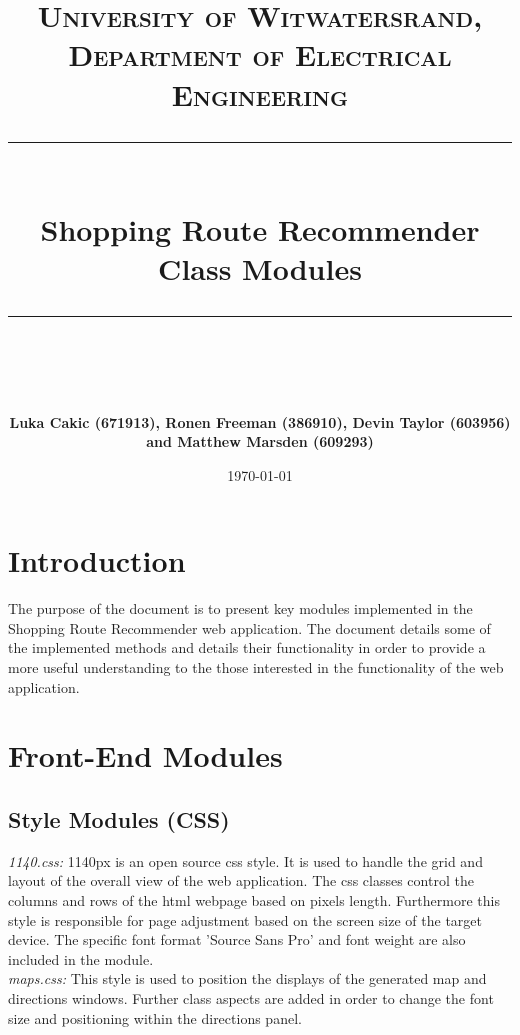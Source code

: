 \documentclass[10pt, a4paper, twocolumn]{scrartcl}
\newcommand{\horrule}[1]{\rule{\linewidth}{#1}}
\begin{document}
	
	\title{\normalfont \normalsize
		\textsc{University of Witwatersrand, Department of Electrical Engineering} \\ [10pt]
		\horrule{0.5pt} \\ [10pt]
		\huge Shopping Route Recommender Class Modules \\
		\horrule{2pt} \\ [10pt]}
	\author{\textbf{\normalsize{Luka Cakic (671913), Ronen Freeman (386910), Devin Taylor (603956) and Matthew Marsden (609293)}} \\ [10pt]}
	\date {\normalsize \today}
	
	\maketitle
	

	\section{Introduction}
	
		 The purpose of the document is to present key modules implemented in the Shopping Route Recommender web application. The document details some of the implemented methods and details their functionality in order to provide a more useful understanding to the those interested in the functionality of the web application. \\
		 
	\section{Front-End Modules}
	
		\subsection{Style Modules (CSS)}
		
		\textit{1140.css:}  1140px is an open source css style. It is used to handle the grid and layout of the overall view of the web application. The css classes control the columns and rows of the html webpage based on pixels length. Furthermore this style is responsible for page adjustment based on the screen size of the target device. The specific font format 'Source Sans Pro' and font weight are also included in the module.\\
		
		\textit{maps.css:} This style is used to position the displays of the generated map and directions windows. Further class aspects are added in order to change the font size and positioning within the directions panel.\\
		
\end{document}
